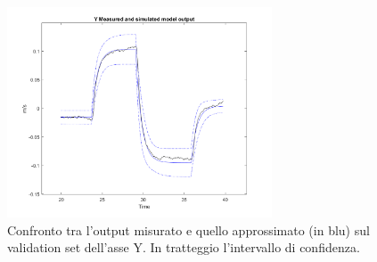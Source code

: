 \begin{figure}
    \centering
    \includegraphics[width=0.7\textwidth]{figs/chapter4/valytimeplot.png}
    \caption{Confronto tra l'output misurato e quello approssimato (in blu) sul validation set dell'asse Y. In tratteggio l'intervallo di confidenza.}
    \label{fig:yvalerr}
\end{figure}

